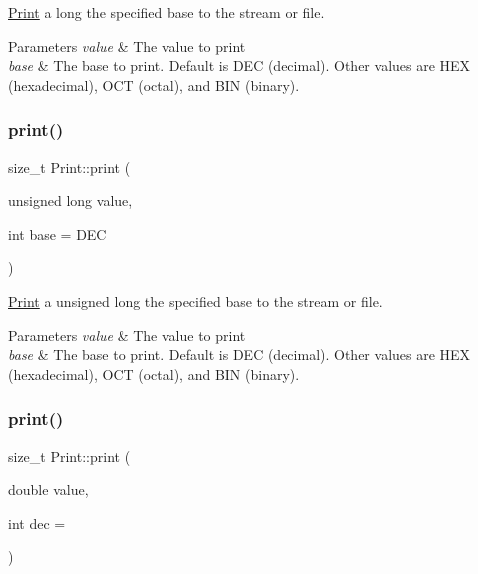 \mbox{\hyperlink{class_print}{Print}} a long the specified base to the stream or file. 


\begin{DoxyParams}{Parameters}
{\em value} & The value to print \\
\hline
{\em base} & The base to print. Default is D\+EC (decimal). Other values are H\+EX (hexadecimal), O\+CT (octal), and B\+IN (binary). \\
\hline
\end{DoxyParams}
\mbox{\label{class_print_acb8c6dcd4339b024436002aa9a6f4be2}} 
\subsubsection{\texorpdfstring{print()}{print()}\hspace{0.1cm}{\footnotesize\ttfamily [5/6]}}
{\footnotesize\ttfamily size\+\_\+t Print\+::print (\begin{DoxyParamCaption}\item[{unsigned long}]{value,  }\item[{int}]{base = {\ttfamily DEC} }\end{DoxyParamCaption})}



\mbox{\hyperlink{class_print}{Print}} a unsigned long the specified base to the stream or file. 


\begin{DoxyParams}{Parameters}
{\em value} & The value to print \\
\hline
{\em base} & The base to print. Default is D\+EC (decimal). Other values are H\+EX (hexadecimal), O\+CT (octal), and B\+IN (binary). \\
\hline
\end{DoxyParams}
\mbox{\label{class_print_ad89472bdb6539423a42d350beec02ff4}} 
\subsubsection{\texorpdfstring{print()}{print()}\hspace{0.1cm}{\footnotesize\ttfamily [6/6]}}
{\footnotesize\ttfamily size\+\_\+t Print\+::print (\begin{DoxyParamCaption}\item[{double}]{value,  }\item[{int}]{dec = {} }\end{DoxyParamCaption})}



